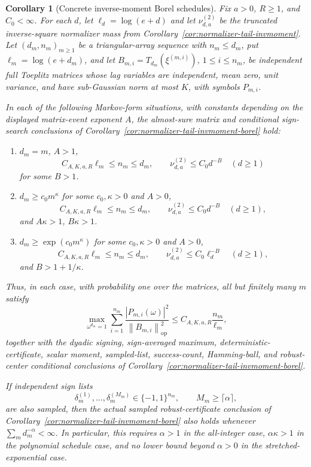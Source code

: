 \documentclass[11pt]{amsart}
\numberwithin{equation}{section}
\newtheorem{corollary}[theorem]{Corollary}
\theoremstyle{definition}
\theoremstyle{remark}
\newcommand{\op}{\mathrm{op}}
\newcommand{\norm}[1]{\left\lVert #1\right\rVert}
\newcommand{\abs}[1]{\left\lvert #1\right\rvert}
\begin{document}
\begin{corollary}[Concrete inverse-moment Borel schedules]
\label{cor:normalizer-tail-invmoment-borel-schedules}
Fix \(a>0\), \(R\ge1\), and \(C_0<\infty\).  For each \(d\), let
\(\ell_d=\log(e+d)\) and let \(\nu_{d,a}^{(2)}\) be the truncated
inverse-square normalizer mass from
Corollary~\ref{cor:normalizer-tail-invmoment}.  Let
\((d_m,n_m)_{m\ge1}\) be a triangular-array sequence with \(n_m\le d_m\), put
\(\ell_m=\log(e+d_m)\), and let \(B_{m,i}=T_{d_m}(\xi^{(m,i)})\),
\(1\le i\le n_m\), be independent full Toeplitz matrices whose lag variables
are independent, mean zero, unit variance, and have sub-Gaussian norm at most
\(K\), with symbols \(P_{m,i}\).

In each of the following Markov-form situations, with constants depending on the
displayed matrix-event exponent \(A\), the almost-sure matrix and conditional
sign-search conclusions of
Corollary~\ref{cor:normalizer-tail-invmoment-borel} hold:
\begin{enumerate}[label=\textup{(\roman*)},leftmargin=2.2em]
\item \(d_m=m\), \(A>1\),
\[
  C_{A,K,a,R}\ell_m\le n_m\le d_m,
  \qquad
  \nu_{d,a}^{(2)}\le C_0d^{-B}\quad(d\ge1)
\]
for some \(B>1\).
\item \(d_m\ge c_0m^\kappa\) for some \(c_0,\kappa>0\) and \(A>0\),
\[
  C_{A,K,a,R}\ell_m\le n_m\le d_m,
  \qquad
  \nu_{d,a}^{(2)}\le C_0d^{-B}\quad(d\ge1),
\]
and \(A\kappa>1\), \(B\kappa>1\).
\item \(d_m\ge\exp(c_0m^\kappa)\) for some \(c_0,\kappa>0\) and \(A>0\),
\[
  C_{A,K,a,R}\ell_m\le n_m\le d_m,
  \qquad
  \nu_{d,a}^{(2)}\le C_0\ell_d^{-B}\quad(d\ge1),
\]
and \(B>1+1/\kappa\).
\end{enumerate}
Thus, in each case, with probability one over the matrices, all but finitely
many \(m\) satisfy
\[
  \max_{\omega^{d_m}=1}
  \sum_{i=1}^{n_m}
  \frac{\abs{P_{m,i}(\omega)}^2}{\norm{B_{m,i}}_{\op}^2}
  \le C_{A,K,a,R}\frac{n_m}{\ell_m},
\]
together with the dyadic signing, sign-averaged maximum,
deterministic-certificate, scalar moment, sampled-list, success-count,
Hamming-ball, and robust-center conditional conclusions of
Corollary~\ref{cor:normalizer-tail-invmoment-borel}.

If independent sign lists
\[
  \delta_m^{(1)},\ldots,\delta_m^{(M_m)}\in\{-1,1\}^{n_m},
  \qquad M_m\ge\lceil\alpha\rceil,
\]
are also sampled, then the actual sampled robust-certificate conclusion of
Corollary~\ref{cor:normalizer-tail-invmoment-borel} also holds whenever
\(\sum_m d_m^{-\alpha}<\infty\).  In particular, this requires
\(\alpha>1\) in the all-integer case, \(\alpha\kappa>1\) in the polynomial
schedule case, and no lower bound beyond \(\alpha>0\) in the
stretched-exponential case.


\end{corollary}
\end{document}
